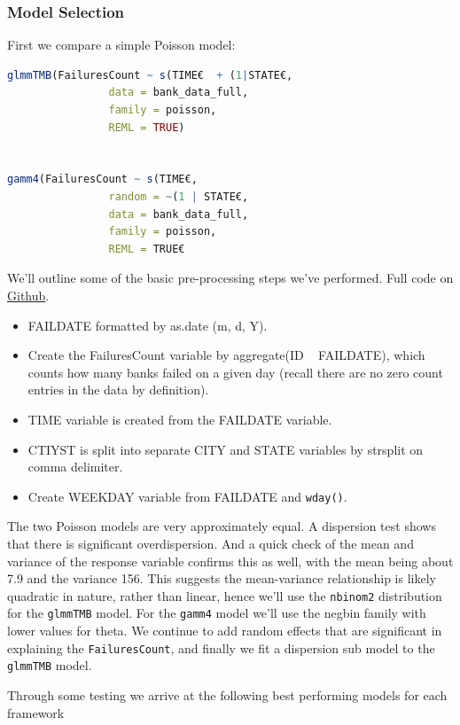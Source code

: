 \documentclass[12pt, twoside,hidelinks]{article}
\theoremstyle{definition}
\numberwithin{equation}{section}
\begin{document}
\subsubsection{Model Selection}
First we compare a simple Poisson model: 

\begin{lstlisting}[language=R]
glmmTMB(FailuresCount ~ s(TIME€  + (1|STATE€,
                data = bank_data_full, 
                family = poisson,
                REML = TRUE)


gamm4(FailuresCount ~ s(TIME€, 
                random = ~(1 | STATE€,
                data = bank_data_full, 
                family = poisson,
                REML = TRUE€ 
\end{lstlisting}

We'll outline some of the basic pre-processing steps we've performed. Full code on \href{https://github.com/AllInCade/MasterProject}{Github}.

\begin{itemize}
    \item FAILDATE formatted by as.date (m, d, Y).
    \item Create the FailuresCount variable by aggregate(ID ~ FAILDATE), which counts how many banks failed on a given day (recall there are no zero count entries in the data by definition). 
    \item TIME variable is created from the FAILDATE variable. 
    \item CTIYST is split into separate CITY and STATE variables by strsplit on comma delimiter.
    \item Create WEEKDAY variable from FAILDATE and \texttt{wday()}. 
\end{itemize}

The two Poisson models are very approximately equal. A dispersion test shows that there is significant overdispersion. And a quick check of the mean and variance of the response variable confirms this as well, with the mean being about 7.9 and the variance 156. This suggests the mean-variance relationship is likely quadratic in nature, rather than linear, hence we'll use the \texttt{nbinom2} distribution for the \texttt{glmmTMB} model. For the \texttt{gamm4} model we'll use the negbin family with lower values for theta. We continue to add random effects that are significant in explaining the \texttt{FailuresCount}, and finally we fit a dispersion sub model to the \texttt{glmmTMB} model. 

Through some testing we arrive at the following best performing models for each framework
\end{document}
